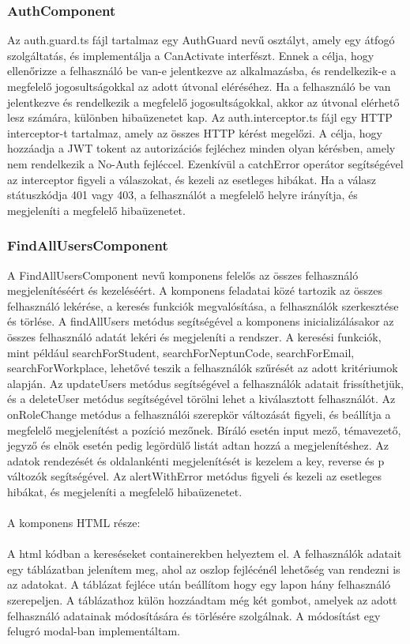 \subsubsection{AuthComponent}

Az auth.guard.ts fájl tartalmaz egy AuthGuard nevű osztályt, amely egy átfogó szolgáltatás, és implementálja a CanActivate interfészt. Ennek a célja, hogy ellenőrizze a felhasználó be van-e jelentkezve az alkalmazásba, és rendelkezik-e a megfelelő jogosultságokkal az adott útvonal eléréséhez. Ha a felhasználó be van jelentkezve és rendelkezik a megfelelő jogosultságokkal, akkor az útvonal elérhető lesz számára, különben hibaüzenetet kap. Az auth.interceptor.ts fájl egy HTTP interceptor-t tartalmaz, amely az összes HTTP kérést megelőzi. A célja, hogy hozzáadja a JWT tokent az autorizációs fejléchez minden olyan kérésben, amely nem rendelkezik a No-Auth fejléccel. Ezenkívül a catchError operátor segítségével az interceptor figyeli a válaszokat, és kezeli az esetleges hibákat. Ha a válasz státuszkódja 401 vagy 403, a felhasználót a megfelelő helyre irányítja, és megjeleníti a megfelelő hibaüzenetet.


\subsubsection{FindAllUsersComponent}

A FindAllUsersComponent nevű komponens felelős az összes felhasználó megjelenítéséért és kezeléséért. A komponens feladatai közé tartozik az összes felhasználó lekérése, a keresés funkciók megvalósítása, a felhasználók szerkesztése és törlése. A findAllUsers metódus segítségével a komponens inicializálásakor az összes felhasználó adatát lekéri és megjeleníti a rendszer. A keresési funkciók, mint például searchForStudent, searchForNeptunCode, searchForEmail, searchForWorkplace, lehetővé teszik a felhasználók szűrését az adott kritériumok alapján.  Az updateUsers metódus segítségével a felhasználók adatait frissíthetjük, és a deleteUser metódus segítségével törölni lehet a kiválasztott felhasználót. Az onRoleChange metódus a felhasználói szerepkör változását figyeli, és beállítja a megfelelő megjelenítést a pozíció mezőnek. Bíráló esetén input mező, témavezető, jegyző és elnök esetén pedig legördülő listát adtan hozzá a megjelenítéshez. Az adatok rendezését és oldalankénti megjelenítését is kezelem a key, reverse és p változók segítségével. Az alertWithError metódus figyeli és kezeli az esetleges hibákat, és megjeleníti a megfelelő hibaüzenetet.\\
\\
A komponens HTML része:\\
\\
A html kódban a kereséseket containerekben helyeztem el. A felhasználók adatait egy táblázatban jelenítem meg, ahol az oszlop fejlécénél lehetőség van rendezni is az adatokat. A táblázat fejléce után beállítom hogy egy lapon hány felhasználó szerepeljen. A táblázathoz külön hozzáadtam még két gombot, amelyek az adott felhasználó adatainak módosítására és törlésére szolgálnak. A módosítást egy felugró modal-ban implementáltam.


